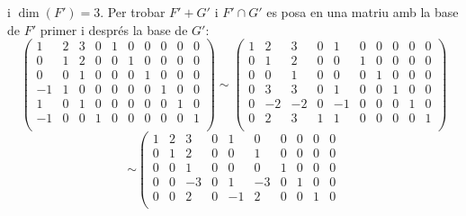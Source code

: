 \documentclass[a4paper, 12pt]{article}
\begin{document}
\begin{solucio}
        i $\dim(F') = 3$. Per trobar $F'+G'$ i $F' \cap G'$ es posa en una matriu amb la base de $F'$
        primer i després la base de $G'$:
        \begin{displaymath}
            \left(
                \begin{array}{cccc|cccccc}
                    1 & 2 & 3 & 0 & 1 & 0 & 0 & 0 & 0 & 0\\
                    0 & 1 & 2 & 0 & 0 & 1 & 0 & 0 & 0 & 0\\
                    0 & 0 & 1 & 0 & 0 & 0 & 1 & 0 & 0 & 0\\
                    \hline
                    -1 & 1 & 0 & 0 & 0 & 0 & 0 & 1 & 0 & 0\\
                    1 & 0 & 1 & 0 & 0 & 0 & 0 & 0 & 1 & 0\\
                    -1 & 0 & 0 & 1 & 0 & 0 & 0 & 0 & 0 & 1\\
                \end{array}
            \right)
            \sim
            \left(
                \begin{array}{cccc|cccccc}
                    1 & 2 & 3 & 0 & 1 & 0 & 0 & 0 & 0 & 0\\
                    0 & 1 & 2 & 0 & 0 & 1 & 0 & 0 & 0 & 0\\
                    0 & 0 & 1 & 0 & 0 & 0 & 1 & 0 & 0 & 0\\
                    \hline
                    0 & 3 & 3 & 0 & 1 & 0 & 0 & 1 & 0 & 0\\
                    0 & -2 & -2 & 0 & -1 & 0 & 0 & 0 & 1 & 0\\
                    0 & 2 & 3 & 1 & 1 & 0 & 0 & 0 & 0 & 1\\
                \end{array}
            \right)
        \end{displaymath}
        \begin{displaymath}
            \sim
            \left(
                \begin{array}{cccc|cccccc}
                    1 & 2 & 3 & 0 & 1 & 0 & 0 & 0 & 0 & 0\\
                    0 & 1 & 2 & 0 & 0 & 1 & 0 & 0 & 0 & 0\\
                    0 & 0 & 1 & 0 & 0 & 0 & 1 & 0 & 0 & 0\\
                    \hline
                    0 & 0 & -3 & 0 & 1 & -3 & 0 & 1 & 0 & 0\\
                    0 & 0 & 2 & 0 & -1 & 2 & 0 & 0 & 1 & 0\\

\end{array}
\end{displaymath}
\end{solucio}
\end{document}
